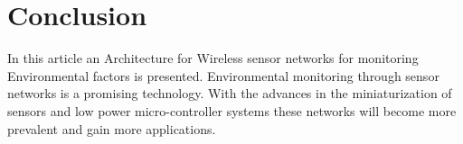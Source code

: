 \documentclass[conference]{IEEEtran}
\begin{document}
%





\section{Conclusion}
In this article an Architecture for Wireless sensor networks for monitoring Environmental factors is presented.
Environmental monitoring through sensor networks is a promising technology. With the advances in the miniaturization of sensors and low power micro-controller systems these networks will become more prevalent and gain more applications.
\end{document}
